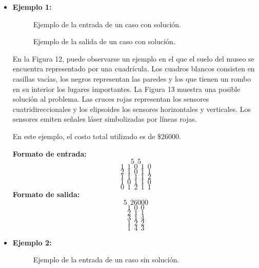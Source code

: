 \begin{itemize}
\item {\large{\textbf{Ejemplo 1:}}}

\begin{figure}[H] %
\hfill
\begin{minipage}[t]{.45\textwidth}
\begin{center}
\caption{Ejemplo de la entrada de un caso con solución.}
\label{fig-tc1}
\end{center}
\end{minipage}
\hfill
\begin{minipage}[t]{.45\textwidth}
\begin{center}
\caption{Ejemplo de la salida de un caso con solución.}
\label{fig-tc2}
\end{center}
\end{minipage}
\hfill
\end{figure}

En la Figura 12, puede observarse un ejemplo en el que el suelo del museo se encuentra representado por una cuadrícula. Los cuadros blancos consisten en casillas vacías, los negros representan las paredes y los que tienen un rombo en su interior los lugares importantes. La Figura 13 muestra una posible solución al problema. Las cruces rojas representan los sensores cuatridireccionales y los elipsoides los sensores horizontales y verticales. Los sensores emiten señales láser simbolizadas por líneas rojas.\newline

En este ejemplo, el costo total utilizado es de \$26000.

\textbf{Formato de entrada:} 
$$5\ \ 5$$
$$1\ \ 1\ \ 0\ \ 1\ \ 0$$
$$2\ \ 1\ \ 0\ \ 1\ \ 1$$
$$1\ \ 1\ \ 1\ \ 1\ \ 2$$
$$1\ \ 0\ \ 1\ \ 1\ \ 0$$
$$0\ \ 1\ \ 2\ \ 1\ \ 1$$
\textbf{Formato de salida:} 
$$5\ \ 26000$$
$$1\ \ 0\ \ 0$$
$$2\ \ 1\ \ 1$$
$$3\ \ 1\ \ 4$$
$$1\ \ 2\ \ 2$$
$$1\ \ 4\ \ 3$$

\newline

\item {\large{\textbf{Ejemplo 2:}}}

\begin{center}
\begin{figure}[H] %
\begin{minipage}[t]{.45\textwidth}
\begin{center}
\caption{Ejemplo de la entrada de un caso sin solución.}
\end{center}
\label{fig-tc1}
\end{minipage}
\end{figure}
\end{center}


\end{itemize}
